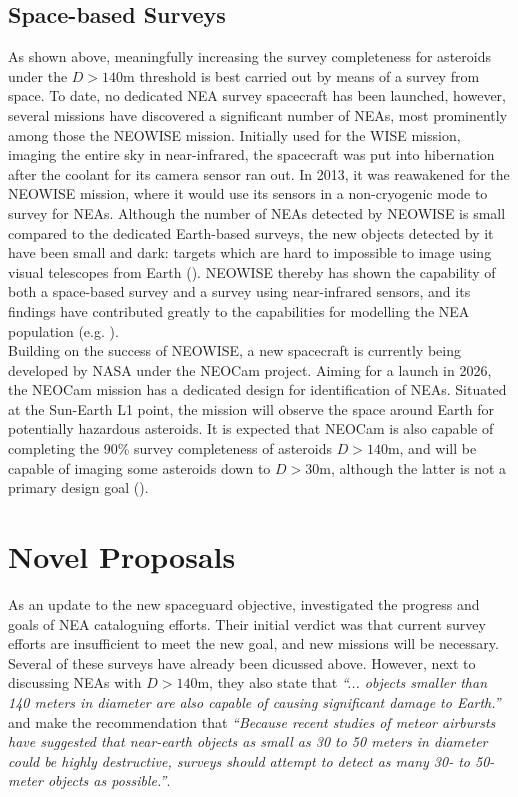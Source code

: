 \subsection{Space-based Surveys}
As shown above, meaningfully increasing the survey completeness for asteroids under the $D > 140 \mathrm{m}$ threshold is best carried out by means of a survey from space. To date, no dedicated NEA survey spacecraft has been launched, however, several missions have discovered a significant number of NEAs, most prominently among those the NEOWISE mission. Initially used for the WISE mission, imaging the entire sky in near-infrared, the spacecraft was put into hibernation after the coolant for its camera sensor ran out. In 2013, it was reawakened for the NEOWISE mission, where it would use its sensors in a non-cryogenic mode to survey for NEAs. Although the number of NEAs detected by NEOWISE is small compared to the dedicated Earth-based surveys, the new objects detected by it have been small and dark: targets which are hard to impossible to image using visual telescopes from Earth (\cite{NEOWISEResult}). NEOWISE thereby has shown the capability of both a space-based survey and a survey using near-infrared sensors, and its findings have contributed greatly to the capabilities for modelling the NEA population (e.g. \cite{GranvikPopulation}).\\

Building on the success of NEOWISE, a new spacecraft is currently being developed by NASA under the NEOCam project. Aiming for a launch in 2026, the NEOCam mission has a dedicated design for identification of NEAs. Situated at the Sun-Earth L1 point, the mission will observe the space around Earth for potentially hazardous asteroids. It is expected that NEOCam is also capable of completing the 90\% survey completeness of asteroids $D > 140 \mathrm{m}$, and will be capable of imaging some asteroids down to $D > 30 \mathrm{m}$, although the latter is not a primary design goal (\cite{NEOCam}).

\section{Novel Proposals}
\label{sec:introductionproposals}
As an update to the new spaceguard objective, \cite{DefendingEarth} investigated the progress and goals of NEA cataloguing efforts. Their initial verdict was that current survey efforts are insufficient to meet the new goal, and new missions will be necessary. Several of these surveys have already been dicussed above. However, next to discussing NEAs with $D > 140 \mathrm{m}$, they also state that \textit{``... objects smaller than 140 meters in diameter are also capable of causing significant damage to Earth.''} and make the recommendation that \textit{``Because recent studies of meteor airbursts have suggested that near-earth objects as small as 30 to 50 meters in diameter could be highly destructive, surveys should attempt to detect as many 30- to 50-meter objects as possible.''}. \\

